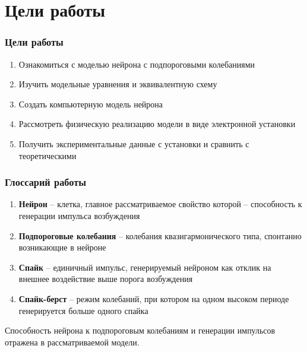 \section{Цели работы}
\begin{frame}[t]
	\frametitle{Цели работы}
	\vfill
	\begin{spacing}{1}
		\begin{enumerate}
			\item Ознакомиться с моделью нейрона с подпороговыми колебаниями
			\item Изучить модельные уравнения и эквивалентную схему
			\item Создать компьютерную модель нейрона
			\item Рассмотреть физическую реализацию модели в виде электронной установки
			\item Получить экспериментальные данные с установки и сравнить с теоретическими
		\end{enumerate}
	\end{spacing}
	\vfill
\end{frame}
\begin{frame}[c]
	\frametitle{Глоссарий работы}
	\begin{spacing}{1}
		\begin{enumerate}
			\item \textbf{Нейрон} – клетка, главное рассматриваемое свойство которой -- способность к генерации импульса возбуждения
			\item \textbf{Подпороговые колебания} – колебания квазигармонического типа, спонтанно возникающие в нейроне
			\item \textbf{Спайк} – единичный импульс, генерируемый нейроном как отклик на внешнее воздействие выше порога возбуждения
			\item \textbf{Спайк-берст} – режим колебаний, при котором на одном высоком периоде генерируется больше одного спайка  
		\end{enumerate}
		\vspace{1em}
		Способность нейрона к подпороговым колебаниям и генерации импульсов отражена в рассматриваемой модели.
	\end{spacing}
\end{frame}
